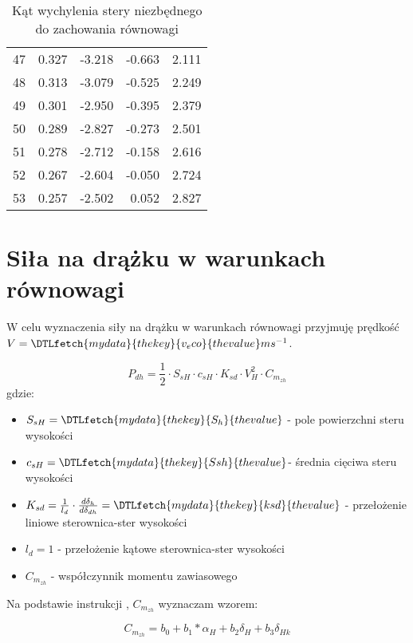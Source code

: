 \documentclass{sprawozdanie}
\newcommand{\PlaneVar}[1]{\DTLfetch{mydata}{thekey}{#1}{thevalue}}
\begin{document}
\begin{table}[h!]
\begin{tabular}{rrrrr}
        47  &  0.327 &    -3.218 &    -0.663 &     2.111 \\
        48  &  0.313 &    -3.079 &    -0.525 &     2.249 \\
        49  &  0.301 &    -2.950 &    -0.395 &     2.379 \\
        50  &  0.289 &    -2.827 &    -0.273 &     2.501 \\
        51  &  0.278 &    -2.712 &    -0.158 &     2.616 \\
        52  &  0.267 &    -2.604 &    -0.050 &     2.724 \\
        53  &  0.257 &    -2.502 &     0.052 &     2.827 \\
        \bottomrule
        \end{tabular}
    \caption{Kąt wychylenia stery niezbędnego do zachowania równowagi}
    \label{tab:deltahv}        
\end{table}
\FloatBarrier


\section{Siła na drążku w warunkach równowagi}
W celu wyznaczenia siły na drążku w warunkach równowagi przyjmuję prędkość $V = \PlaneVar{v_eco} ms^{-1}$.

\begin{equation}
    \label{eq:pdh}
    P_{dh} = \frac{1}{2}\cdot S_{sH}\cdot c_{sH} \cdot K_{sd} \cdot  V_H^2 \cdot C_{m_{zh}}
\end{equation}
gdzie:
\begin{itemize}
    \item $S_{sH} = \PlaneVar{S_h}$ - pole powierzchni steru wysokości
    \item $c_{sH} = \PlaneVar{Ssh}$- średnia cięciwa steru wysokości
    \item $K_{sd} = \frac{1}{l_d} \cdot \frac{d \delta_h}{d \delta_{dh}} = \PlaneVar{ksd}$ - przełożenie liniowe sterownica-ster wysokości
    \item $l_d = 1$ - przełożenie kątowe sterownica-ster wysokości
    \item $C_{m_{zh}}$ - współczynnik momentu zawiasowego
\end{itemize}

Na podstawie instrukcji \cite{Instrukcja9}, $C_{m_{zh}}$ wyznaczam wzorem:

\begin{equation}
    C_{m_{zh}}=b_0 + b_1*\alpha_H + b_2\delta_H+b_3\delta_{Hk}
\end{equation}
\end{document}
